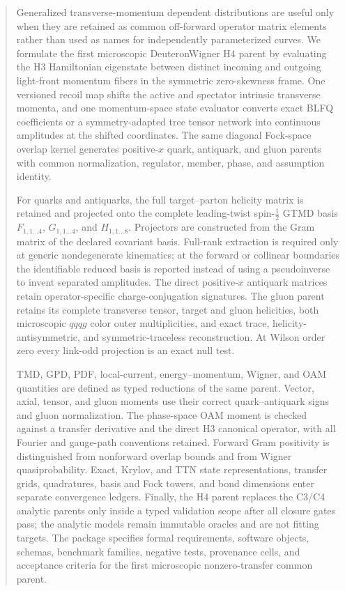 \documentclass[11pt]{article}
\begin{document}
\begin{abstract}
Generalized transverse-momentum dependent distributions are useful only when
they are retained as common off-forward operator matrix elements rather than
used as names for independently parameterized curves.  We formulate the
first microscopic DeuteronWigner H4 parent by evaluating the H3 Hamiltonian
eigenstate between distinct incoming and outgoing light-front momentum
fibers in the symmetric zero-skewness frame.  One versioned recoil map shifts
the active and spectator intrinsic transverse momenta, and one momentum-space
state evaluator converts exact BLFQ coefficients or a symmetry-adapted tree
tensor network into continuous amplitudes at the shifted coordinates.  The
same diagonal Fock-space overlap kernel generates positive-\(x\) quark,
antiquark, and gluon parents with common normalization, regulator, member,
phase, and assumption identity.

For quarks and antiquarks, the full target--parton helicity matrix is retained
and projected onto the complete leading-twist spin-\(\tfrac12\) GTMD basis
\(F_{1,1\ldots4}\), \(G_{1,1\ldots4}\), and
\(H_{1,1\ldots8}\).  Projectors are constructed from the Gram matrix of the
declared covariant basis.  Full-rank extraction is required only at generic
nondegenerate kinematics; at the forward or collinear boundaries the
identifiable reduced basis is reported instead of using a pseudoinverse to
invent separated amplitudes.  The direct positive-\(x\) antiquark matrices
retain operator-specific charge-conjugation signatures.  The gluon parent
retains its complete transverse tensor, target and gluon helicities, both
microscopic \(qqqg\) color outer multiplicities, and exact trace,
helicity-antisymmetric, and symmetric-traceless reconstruction.  At Wilson
order zero every link-odd projection is an exact null test.

TMD, GPD, PDF, local-current, energy--momentum, Wigner, and OAM quantities are
defined as typed reductions of the same parent.  Vector, axial, tensor, and
gluon moments use their correct quark--antiquark signs and gluon normalization.
The phase-space OAM moment is checked against a transfer derivative and the
direct H3 canonical operator, with all Fourier and gauge-path conventions
retained.  Forward Gram positivity is distinguished from nonforward
overlap bounds and from Wigner quasiprobability.  Exact, Krylov, and TTN
state representations, transfer grids, quadratures, basis and Fock towers,
and bond dimensions enter separate convergence ledgers.  Finally, the H4
parent replaces the C3/C4 analytic parents only inside a typed validation
scope after all closure gates pass; the analytic models remain immutable
oracles and are not fitting targets.  The package specifies formal
requirements, software objects, schemas, benchmark families, negative tests,
provenance cells, and acceptance criteria for the first microscopic
nonzero-transfer common parent.
\end{abstract}
\end{document}
